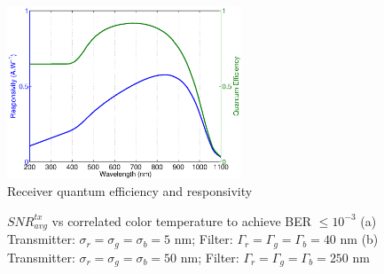 \begin{figure}[!b]
	\centering
		\includegraphics[trim={0.15in 0.05in 0.05in 0.0in}, clip=true, width=2.75in]{img/RecvResp.eps}
	\caption{Receiver quantum efficiency and responsivity \cite{qeff}}
	\label{fig:RecvResp}
\end{figure}

\begin{figure}[tbph]
\centerline{
\hfil 
{}}
\caption{$SNR_{avg}^{tx}$ vs correlated color temperature to achieve BER $\leq 10^{-3}$ \newline(a) Transmitter: $\sigma_r = \sigma_g = \sigma_b = 5$ nm; Filter: $\Gamma_r = \Gamma_g = \Gamma_b = 40$ nm (b) Transmitter: $\sigma_r = \sigma_g = \sigma_b = 50$ nm; Filter: $\Gamma_r = \Gamma_g = \Gamma_b = 250$ nm}
\label{fig:SNRvsCCT}
\end{figure}
\global\let\figone\relax

